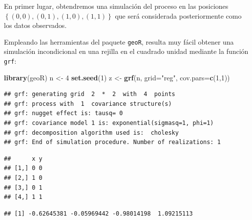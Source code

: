 \documentclass[]{book}
\newenvironment{Shaded}{\begin{snugshade}}{\end{snugshade}}
\newcommand{\KeywordTok}[1]{\textcolor[rgb]{0.13,0.29,0.53}{\textbf{#1}}}
\newcommand{\DataTypeTok}[1]{\textcolor[rgb]{0.13,0.29,0.53}{#1}}
\newcommand{\DecValTok}[1]{\textcolor[rgb]{0.00,0.00,0.81}{#1}}
\newcommand{\StringTok}[1]{\textcolor[rgb]{0.31,0.60,0.02}{#1}}
\newcommand{\CommentTok}[1]{\textcolor[rgb]{0.56,0.35,0.01}{\textit{#1}}}
\newcommand{\OperatorTok}[1]{\textcolor[rgb]{0.81,0.36,0.00}{\textbf{#1}}}
\newcommand{\NormalTok}[1]{#1}
\theoremstyle{definition}
\theoremstyle{definition}
\theoremstyle{definition}
\theoremstyle{remark}
\begin{document}
En primer lugar, obtendremos una simulación del proceso en las
posiciones \(\left\{(0,0),(0,1),(1,0),(1,1)\right\}\) que será
considerada posteriormente como los datos observados.

Empleando las herramientas del paquete \texttt{geoR}, resulta muy fácil
obtener una simulación incondicional en una rejilla en el cuadrado
unidad mediante la función \texttt{grf}:

\begin{Shaded}
\begin{Highlighting}[]
\KeywordTok{library}\NormalTok{(geoR)}
\NormalTok{n <-}\StringTok{ }\DecValTok{4}
\KeywordTok{set.seed}\NormalTok{(}\DecValTok{1}\NormalTok{)}
\NormalTok{z <-}\StringTok{ }\KeywordTok{grf}\NormalTok{(n, }\DataTypeTok{grid=}\StringTok{"reg"}\NormalTok{, }\DataTypeTok{cov.pars=}\KeywordTok{c}\NormalTok{(}\DecValTok{1}\NormalTok{,}\DecValTok{1}\NormalTok{))}
\end{Highlighting}
\end{Shaded}

\begin{verbatim}
## grf: generating grid  2  *  2  with  4  points
## grf: process with  1  covariance structure(s)
## grf: nugget effect is: tausq= 0 
## grf: covariance model 1 is: exponential(sigmasq=1, phi=1)
## grf: decomposition algorithm used is:  cholesky 
## grf: End of simulation procedure. Number of realizations: 1
\end{verbatim}

\begin{Shaded}
\end{Shaded}

\begin{verbatim}
##      x y
## [1,] 0 0
## [2,] 1 0
## [3,] 0 1
## [4,] 1 1
\end{verbatim}

\begin{Shaded}
\end{Shaded}

\begin{verbatim}
## [1] -0.62645381 -0.05969442 -0.98014198  1.09215113
\end{verbatim}
\end{document}

